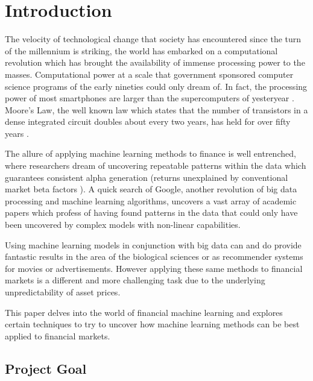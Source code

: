 \documentclass[11pt]{article}
\begin{document}
\clearpage

\tableofcontents

\clearpage


\section{Introduction}

The velocity of technological change that society has encountered since the turn of the millennium is striking, the world has embarked on a computational revolution which has brought the availability of immense processing power to the masses. Computational power at a scale that government sponsored computer science programs of the early nineties could only dream of. In fact, the processing power of most smartphones are larger than the supercomputers of yesteryear \cite{supercomp}.
\newline Moore's Law, the well known law which states that the number of transistors in a dense integrated circuit doubles about every two years, has held for over fifty years \cite{MacK2011}. 

\par
The allure of applying machine learning methods to finance is well entrenched, where researchers dream of uncovering repeatable patterns within the data which guarantees consistent alpha generation (returns unexplained by conventional market beta factors \cite{Rebonato2017}). A quick search of Google, another revolution of big data processing and machine learning algorithms, uncovers a vast array of academic papers which profess of having found patterns in the data that could only have been uncovered by complex models with non-linear capabilities. \par Using machine learning models in conjunction with big data can and do provide fantastic results in the area of the biological sciences or as recommender systems for movies or advertisements. However applying these same methods to financial markets is a different and more challenging task due to the underlying unpredictability of asset prices.\par
This paper delves into the world of financial machine learning and explores certain techniques to try to uncover how machine learning methods can be best applied to financial markets.
 \subsection{Project Goal}
\end{document}
